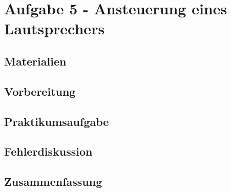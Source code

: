\section{Aufgabe 5 - Ansteuerung eines Lautsprechers}
\label{sec:aufgabe-5---ansteuerung-eines-lautsprechers}

\subsection{Materialien}
\label{subsec:a5-materialien}

\subsection{Vorbereitung}
\label{subsec:a5-vorbereitung}

\subsection{Praktikumsaufgabe}
\label{subsec:a5-praktikumsaufgabe}

\subsection{Fehlerdiskussion}
\label{subsec:a5-fehlerdiskussion}

\subsection{Zusammenfassung}
\label{subsec:a5-zusammenfassung}
